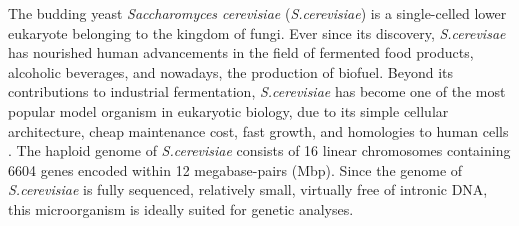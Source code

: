 \documentclass[10pt,a4paper]{article}
\begin{document}





The budding yeast \textit{Saccharomyces cerevisiae} (\textit{S.cerevisiae}) is a single-celled lower eukaryote belonging to the kingdom of fungi. Ever since its discovery, \textit{S.cerevisae} has nourished human advancements in the field of fermented food products, alcoholic beverages, and nowadays, the production of biofuel. Beyond its contributions to industrial fermentation, \textit{S.cerevisiae} has become one of the most popular model organism in eukaryotic biology, due to its simple cellular architecture, cheap maintenance cost, fast growth, and homologies to human cells \cite{botstein_yeast_2011}. The haploid genome of \textit{S.cerevisiae} consists of 16 linear chromosomes containing 6604 genes encoded within 12 megabase-pairs (Mbp)\cite{belda_saccharomyces_2019}. Since the genome of \textit{S.cerevisiae} is fully sequenced, relatively small, virtually free of intronic DNA, this microorganism is ideally suited for genetic analyses.\\
\end{document}
